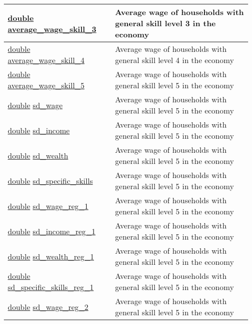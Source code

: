 \documentclass[a4paper,11pt]{article}
\begin{document}
\begin{longtable}[H!]{ll}
\midrule
\parbox{5cm}{\url{double} \url{average_wage_skill_3}}  & \parbox{10cm}{Average wage of households with general skill level 3 in the economy} \\
\midrule
\parbox{5cm}{\url{double} \url{average_wage_skill_4}}  & \parbox{10cm}{Average wage of households with general skill level 4 in the economy} \\
\midrule
\parbox{5cm}{\url{double} \url{average_wage_skill_5}}  & \parbox{10cm}{Average wage of households with general skill level 5 in the economy} \\
\midrule
\parbox{5cm}{\url{double} \url{sd_wage}}  & \parbox{10cm}{Average wage of households with general skill level 5 in the economy} \\
\midrule
\parbox{5cm}{\url{double} \url{sd_income}}  & \parbox{10cm}{Average wage of households with general skill level 5 in the economy} \\
\midrule
\parbox{5cm}{\url{double} \url{sd_wealth}}  & \parbox{10cm}{Average wage of households with general skill level 5 in the economy} \\
\midrule
\parbox{5cm}{\url{double} \url{sd_specific_skills}}  & \parbox{10cm}{Average wage of households with general skill level 5 in the economy} \\
\midrule
\parbox{5cm}{\url{double} \url{sd_wage_reg_1}}  & \parbox{10cm}{Average wage of households with general skill level 5 in the economy} \\
\midrule
\parbox{5cm}{\url{double} \url{sd_income_reg_1}}  & \parbox{10cm}{Average wage of households with general skill level 5 in the economy} \\
\midrule
\parbox{5cm}{\url{double} \url{sd_wealth_reg_1}}  & \parbox{10cm}{Average wage of households with general skill level 5 in the economy} \\
\midrule
\parbox{5cm}{\url{double} \url{sd_specific_skills_reg_1}}  & \parbox{10cm}{Average wage of households with general skill level 5 in the economy} \\
\midrule
\parbox{5cm}{\url{double} \url{sd_wage_reg_2}}  & \parbox{10cm}{Average wage of households with general skill level 5 in the economy} \\

\end{longtable}
\end{document}
